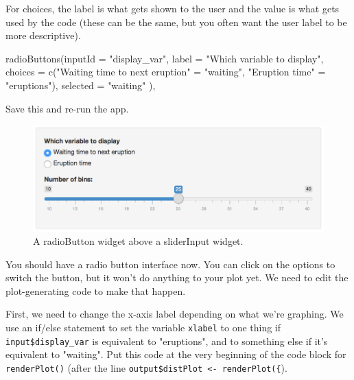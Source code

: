 \documentclass[
  oneside]{book}
\newenvironment{Shaded}{\begin{snugshade}}{\end{snugshade}}
\newcommand{\AttributeTok}[1]{\textcolor[rgb]{0.77,0.63,0.00}{#1}}
\newcommand{\FunctionTok}[1]{\textcolor[rgb]{0.00,0.00,0.00}{#1}}
\newcommand{\NormalTok}[1]{#1}
\newcommand{\OtherTok}[1]{\textcolor[rgb]{0.56,0.35,0.01}{#1}}
\newcommand{\StringTok}[1]{\textcolor[rgb]{0.31,0.60,0.02}{#1}}
\begin{document}
For \AttributeTok{choices}, the label is what gets shown to the user and the value is what gets used by the code (these can be the same, but you often want the user label to be more descriptive).

\begin{Shaded}
\begin{Highlighting}[]
 \FunctionTok{radioButtons}\NormalTok{(}\AttributeTok{inputId =} \StringTok{"display\_var"}\NormalTok{,}
              \AttributeTok{label =} \StringTok{"Which variable to display"}\NormalTok{,}
              \AttributeTok{choices =} \FunctionTok{c}\NormalTok{(}\StringTok{"Waiting time to next eruption"} \OtherTok{=} \StringTok{"waiting"}\NormalTok{,}
                          \StringTok{"Eruption time"} \OtherTok{=} \StringTok{"eruptions"}\NormalTok{),}
              \AttributeTok{selected =} \StringTok{"waiting"}
\NormalTok{ ),}
\end{Highlighting}
\end{Shaded}

Save this and re-run the app.

\begin{figure}

{\centering \includegraphics[width=1\linewidth]{images/demo_app/08-radiobutton-widget} 

}

\caption{A radioButton widget above a sliderInput widget.}\label{fig:first-radiobutton-widget}
\end{figure}

You should have a radio button interface now. You can click on the options to switch the button, but it won't do anything to your plot yet. We need to edit the plot-generating code to make that happen.

First, we need to change the x-axis label depending on what we're graphing. We use an if/else statement to set the variable \texttt{xlabel} to one thing if \texttt{input\$display\_var} is equivalent to \StringTok{"eruptions"}, and to something else if it's equivalent to \StringTok{"waiting"}. Put this code at the very beginning of the code block for \texttt{renderPlot}\texttt{()} (after the line \texttt{output\$distPlot\ \textless{}-\ renderPlot(\{}).
\end{document}
